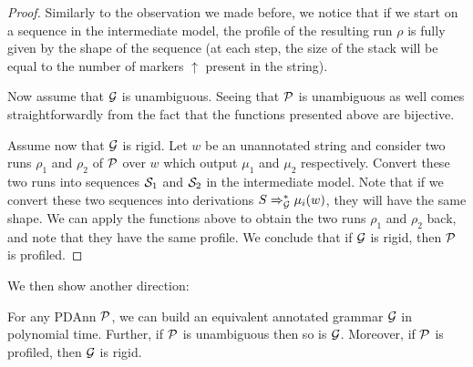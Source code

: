 \begin{proof}
Similarly to the observation we made before, we notice that if we start on a sequence in the intermediate model, the profile of the resulting run $\rho$ is fully given by the shape of the sequence (at each step, the size of the stack will be equal to the number of markers $\uparrow$ present in the string).

Now assume that $\mathcal{G}$ is unambiguous. Seeing that $\mathcal{P}$ is unambiguous as well comes straightforwardly from the fact that the functions presented above are bijective.

Assume now that $\mathcal{G}$ is rigid. Let $w$ be an unannotated string and consider two runs $\rho_1$ and $\rho_2$ of $\mathcal{P}$ over $w$ which output $\mu_1$ and $\mu_2$ respectively. Convert these two runs into sequences $\mathcal{S}_1$ and $\mathcal{S}_2$ in the intermediate model. Note that if we convert these two sequences into derivations $S\Rightarrow_{\mathcal{G}}^*\mu_i(w)$, they will have the same shape. We can apply the functions above to obtain the two runs $\rho_1$ and $\rho_2$ back, and note that they have the same profile. We conclude that if $\mathcal{G}$ is rigid, then $\mathcal{P}$ is profiled.
\end{proof}

We then show another direction:

\begin{claim}
	\label{gram:prp:pdt2g}
	For any PDAnn $\mathcal{P}$, we can build an equivalent annotated grammar $\mathcal{G}$ in polynomial
	time. Further, if $\mathcal{P}$ is unambiguous then so is $\mathcal{G}$. Moreover, if $\mathcal{P}$ is profiled, then $\mathcal{G}$ is rigid.
\end{claim}

